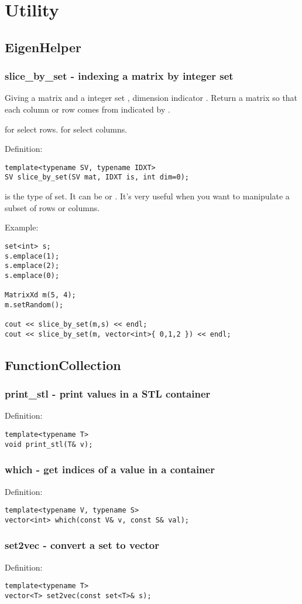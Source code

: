\chapter{Utility}

\section{EigenHelper}
\subsection{slice\_by\_set - indexing a matrix by integer set}
Giving a matrix  and a integer set , dimension indicator . Return a matrix so that each column or row comes from  indicated by .

 for select rows.  for select columns.

\noindent Definition:
\begin{lstlisting}
template<typename SV, typename IDXT>
SV slice_by_set(SV mat, IDXT is, int dim=0);
\end{lstlisting}

 is the type of set. It can be  or . It's very useful when you want to manipulate a subset of rows or columns.

\noindent Example:
\begin{lstlisting}
set<int> s;
s.emplace(1);
s.emplace(2);
s.emplace(0);

MatrixXd m(5, 4);
m.setRandom();

cout << slice_by_set(m,s) << endl;
cout << slice_by_set(m, vector<int>{ 0,1,2 }) << endl;
\end{lstlisting}

\section{FunctionCollection}
\subsection{print\_stl - print values in a STL container}

\noindent Definition:
\begin{lstlisting}
template<typename T>
void print_stl(T& v);
\end{lstlisting}

\subsection{which - get indices of a value in a container}
\noindent Definition:
\begin{lstlisting}
template<typename V, typename S>
vector<int> which(const V& v, const S& val);
\end{lstlisting}

\subsection{set2vec - convert a set to vector}
\noindent Definition:
\begin{lstlisting}
template<typename T>
vector<T> set2vec(const set<T>& s);
\end{lstlisting}